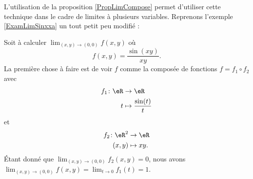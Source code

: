 L'utilisation de la proposition \ref{PropLimCompose} permet d'utiliser cette technique dans le cadre de limites à plusieurs variables. Reprenons l'exemple \ref{ExamLimSinxxa} un tout petit peu modifié :

\begin{example}
	Soit à calculer $\lim_{(x,y)\to(0,0)}f(x,y)$ où
	\begin{equation}
		f(x,y)=\frac{ \sin(xy) }{ xy }.
	\end{equation}
	La première chose à faire est de voir $f$ comme la composée de fonctions $f=f_1\circ f_2$ avec
	\begin{equation}
		\begin{aligned}
			f_1\colon \eR&\to \eR \\
			t&\mapsto \frac{ \sin(t) }{ t } 
		\end{aligned}
	\end{equation}
	et
	\begin{equation}
		\begin{aligned}
			f_2\colon \eR^2&\to \eR \\
			(x,y)&\mapsto xy. 
		\end{aligned}
	\end{equation}
	 Étant donné que $\lim_{(x,y)\to(0,0)}f_2(x,y)=0$, nous avons $\lim_{(x,y)\to(0,0)}f(x,y)=\lim_{t\to 0} f_1(t)=1$.
\end{example}
